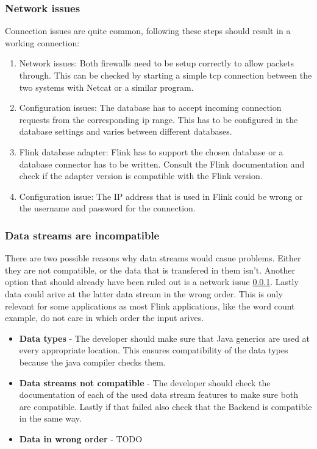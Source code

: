 \subsubsection{Network issues}
\label{mdfCorrectNetwork}
Connection issues are quite common, following these steps should result in a working connection:
\begin{enumerate}
  \item Network issues: Both firewalls need to be setup correctly to allow packets through. This can be checked by starting a simple tcp connection between the two systems with Netcat or a similar program.
  \item Configuration issues: The database has to accept incoming connection requests from the corresponding ip range. This has to be configured in the database settings and varies between different databases.
  \item Flink database adapter: Flink has to support the chosen database or a database connector has to be written. Consult the Flink documentation and check if the adapter version is compatible with the Flink version.
  \item Configuration issue: The IP address that is used in Flink could be wrong or the username and password for the connection.
\end{enumerate}

\subsubsection{Data streams are incompatible}
\label{mdfCorrectDataStreams}
There are two possible reasons why data streams would casue problems. Either they are not compatible, or the data that is transfered in them isn't. Another option that should already have been ruled out is a network issue \ref{mdfCorrectNetwork}. Lastly data could arive at the latter data stream in the wrong order. This is only relevant for some applications as most Flink applications, like the word count example, do not care in which order the input arives.
\begin{itemize}
  \item \textbf{Data types} - The developer should make sure that Java generics are used at every appropriate location. This ensures compatibility of the data types because the java compiler checks them.
  \item \textbf{Data streams not compatible} - The developer should check the documentation of each of the used data stream features to make sure both are compatible. Lastly if that failed also check that the Backend is compatible in the same way.
  \item \textbf{Data in wrong order} - TODO
\end{itemize}

